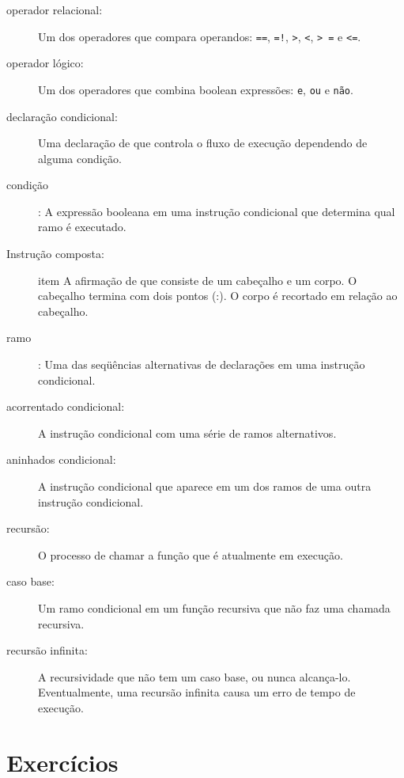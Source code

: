 \documentclass[10pt]{book}
\begin{document}
\begin{exercise}
{{\begin{description}
\item[operador relacional:] Um dos operadores que compara
operandos: {\tt ==}, {\tt =!}, {\tt>}, {\tt <}, {\tt> =} e {\tt <=}.

\item[operador lógico:] Um dos operadores que combina boolean
expressões: {\tt e}, {\tt ou} e {\tt não}.

\item[declaração condicional:] Uma declaração de que controla o fluxo de
execução dependendo de alguma condição.

\item[condição]: A expressão booleana em uma instrução condicional
que determina qual ramo é executado.

\item[Instrução composta:] item A afirmação de que consiste de um cabeçalho
e um corpo. O cabeçalho termina com dois pontos (:). O corpo é recortado
em relação ao cabeçalho.

\item[ramo]: Uma das seqüências alternativas de declarações em
uma instrução condicional.

\item[acorrentado condicional:] A instrução condicional com uma série
de ramos alternativos.

\item[aninhados condicional:] A instrução condicional que aparece
em um dos ramos de uma outra instrução condicional.

\item[recursão:] O processo de chamar a função que é
atualmente em execução.

\item[caso base:] Um ramo condicional em um
função recursiva que não faz uma chamada recursiva.

\item[recursão infinita:] A recursividade que não tem um
caso base, ou nunca alcança-lo. Eventualmente, uma recursão infinita
causa um erro de tempo de execução.

\end{description}

\section{Exercícios}

}}
\end{exercise}
\end{document}
